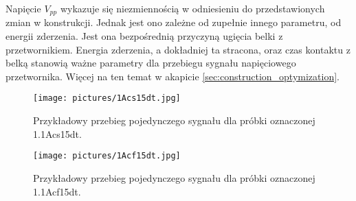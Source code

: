 Napięcie $V_{pp}$ wykazuje się niezmiennością w odniesieniu do przedstawionych zmian 
w konstrukcji. Jednak jest ono zależne od zupełnie innego parametru, od energii zderzenia. 
Jest ona bezpośrednią przyczyną ugięcia belki z przetwornikiem. Energia zderzenia, 
a dokładniej ta stracona, oraz czas kontaktu z belką stanowią ważne parametry 
dla przebiegu sygnału napięciowego przetwornika. Więcej na ten temat w 
akapicie \ref{sec:construction_optymization}.

\begin{figure}[htbp]
\centering
\texttt{[image: pictures/1Acs15dt.jpg]}
\caption{Przykładowy przebieg pojedynczego sygnału dla próbki oznaczonej 1.1Acs15dt.}
\label{fig:scope_without_silencer}
\end{figure}

\begin{figure}[htbp]
\centering
\texttt{[image: pictures/1Acf15dt.jpg]}
\caption{Przykładowy przebieg pojedynczego sygnału dla próbki oznaczonej 1.1Acf15dt.}
\label{fig:scope_with_silencer}
\end{figure}
